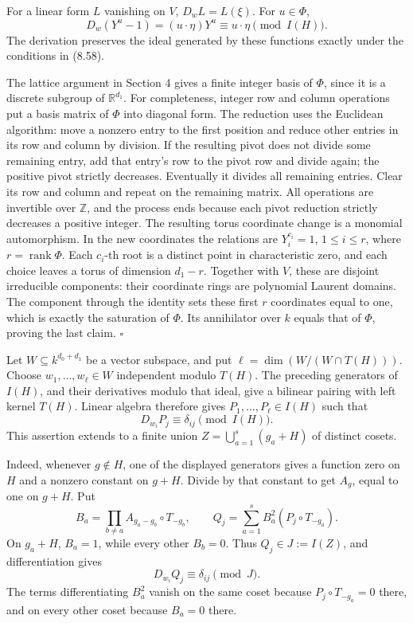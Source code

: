 \documentclass[
  11pt,
  a4paper,
]{article}
\begin{document}
For a linear form \(L\) vanishing on \(V\), \(D_wL=L(\xi)\). For
\(u\in\Phi\), \[
D_w(Y^u-1)=(u\cdot\eta)Y^u
\equiv u\cdot\eta\pmod{I(H)}.
\] The derivation preserves the ideal generated by these functions
exactly under the conditions in (8.58).

The lattice argument in Section 4 gives a finite integer basis of
\(\Phi\), since it is a discrete subgroup of \(\mathbb R^{d_1}\). For
completeness, integer row and column operations put a basis matrix of
\(\Phi\) into diagonal form. The reduction uses the Euclidean algorithm:
move a nonzero entry to the first position and reduce other entries in
its row and column by division. If the resulting pivot does not divide
some remaining entry, add that entry's row to the pivot row and divide
again; the positive pivot strictly decreases. Eventually it divides all
remaining entries. Clear its row and column and repeat on the remaining
matrix. All operations are invertible over \(\mathbb Z\), and the
process ends because each pivot reduction strictly decreases a positive
integer. The resulting torus coordinate change is a monomial
automorphism. In the new coordinates the relations are \(Y_i^{c_i}=1\),
\(1\le i\le r\), where \(r=\operatorname{rank}\Phi\). Each \(c_i\)-th
root is a distinct point in characteristic zero, and each choice leaves
a torus of dimension \(d_1-r\). Together with \(V\), these are disjoint
irreducible components: their coordinate rings are polynomial Laurent
domains. The component through the identity sets these first \(r\)
coordinates equal to one, which is exactly the saturation of \(\Phi\).
Its annihilator over \(k\) equals that of \(\Phi\), proving the last
claim. \(\square\)

Let \(W\subseteq k^{d_0+d_1}\) be a vector subspace, and put
\(\ell=\dim(W/(W\cap T(H)))\). Choose \(w_1,\ldots,w_\ell\in W\)
independent modulo \(T(H)\). The preceding generators of \(I(H)\), and
their derivatives modulo that ideal, give a bilinear pairing with left
kernel \(T(H)\). Linear algebra therefore gives
\(P_1,\ldots,P_\ell\in I(H)\) such that \[
D_{w_i}P_j\equiv\delta_{ij}\pmod{I(H)}.
\] This assertion extends to a finite union \(Z=\bigcup_{a=1}^s(g_a+H)\)
of distinct cosets.

Indeed, whenever \(g\notin H\), one of the displayed generators gives a
function zero on \(H\) and a nonzero constant on \(g+H\). Divide by that
constant to get \(A_g\), equal to one on \(g+H\). Put \[
B_a=\prod_{b\ne a}A_{g_a-g_b}\circ T_{-g_b},
\qquad
Q_j=\sum_{a=1}^s B_a^2(P_j\circ T_{-g_a}).
\] On \(g_a+H\), \(B_a=1\), while every other \(B_b=0\). Thus
\(Q_j\in J:=I(Z)\), and differentiation gives \[
D_{w_i}Q_j\equiv\delta_{ij}\pmod J.
\] The terms differentiating \(B_a^2\) vanish on the same coset because
\(P_j\circ T_{-g_a}=0\) there, and on every other coset because
\(B_a=0\) there.
\end{document}
